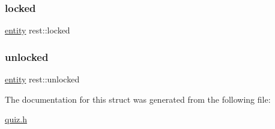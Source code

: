 \mbox{\label{structrest_a063deafa8d3ed41705500b552d9f0e45}} 
\subsubsection{\texorpdfstring{locked}{locked}}
{\footnotesize\ttfamily \hyperlink{structentity}{entity} rest\+::locked}

\mbox{\label{structrest_abdff2c3af489753d37c46a6a2ea318f5}} 
\subsubsection{\texorpdfstring{unlocked}{unlocked}}
{\footnotesize\ttfamily \hyperlink{structentity}{entity} rest\+::unlocked}



The documentation for this struct was generated from the following file\+:\begin{DoxyCompactItemize}
\item 
\hyperlink{quiz_8h}{quiz.\+h}\end{DoxyCompactItemize}
